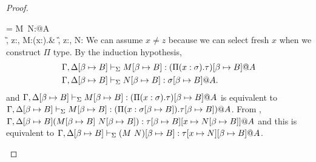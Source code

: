 \begin{proof}
{        \begin{rneqncase}{\TApp{}}{
                 = M\ N:\tau[x\mapsto N]@A\\
                \G, z:\xi@B, \D \V M:\Pi(x:\sigma).\tau@A & \G, z:\xi@B, \D \V N:\sigma@A
                }
                We can assume $x \neq z$ because we can select fresh $x$ when we construct $\Pi$ type.
                By the induction hypothesis,
                \begin{align*}
                    & \G, \D\SB \V M\SB: (\Pi(x:\sigma).\tau)\SB@A \\
                    & \G,\D\SB\V N\SB: \sigma\SB@A.
                \end{align*}
                and \(\G, \D\SB \V M\SB: (\Pi(x:\sigma).\tau)\SB@A\) is equivalent to \( \Gamma, \Delta[\beta \mapsto B] \vdash_\Sigma M[\beta \mapsto B]: (\Pi(x:\sigma[\beta \mapsto B]).\tau[\beta \mapsto B])@A \).
                From \TApp, \(\Gamma,\Delta[\beta \mapsto B] (M[\beta \mapsto B]\ N[\beta \mapsto B]): \tau[\beta \mapsto B][x \mapsto N[\beta \mapsto B]]@A\) and this is equivalent to
                \(\G,\D\SB \V (M\ N)\SB: \tau[x \mapsto N]\SB@A\).
        \end{rneqncase}
        }

\end{proof}













